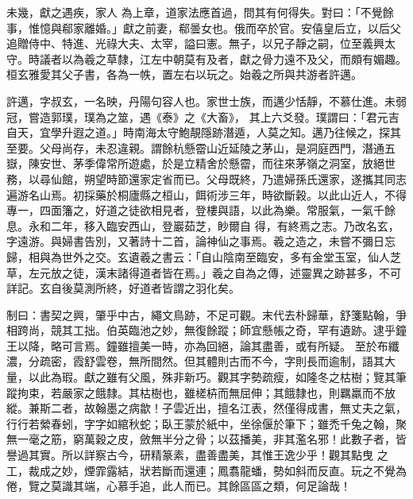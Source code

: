 \begin{pinyinscope}
 未幾，獻之遇疾，家人
 為上章，道家法應首過，問其有何得失。對曰：「不覺餘事，惟憶與郗家離婚。」獻之前妻，郗曇女也。俄而卒於官。安僖皇后立，以后父追贈侍中、特進、光祿大夫、太宰，謚曰憲。無子，以兄子靜之嗣，位至義興太守。時議者以為羲之草隸，江左中朝莫有及者，獻之骨力遠不及父，而頗有媚趣。桓玄雅愛其父子書，各為一帙，置左右以玩之。始羲之所與共游者許邁。



 許邁，字叔玄，一名映，丹陽句容人也。家世士族，而邁少恬靜，不慕仕進。未弱冠，嘗造郭璞，璞為之筮，遇《泰》之《大畜》，
 其上六爻發。璞謂曰：「君元吉自天，宜學升遐之道。」時南海太守鮑靚隱跡潛遁，人莫之知。邁乃往候之，探其至要。父母尚存，未忍違親。謂餘杭懸霤山近延陵之茅山，是洞庭西門，潛通五嶽，陳安世、茅季偉常所遊處，於是立精舍於懸霤，而往來茅嶺之洞室，放絕世務，以尋仙館，朔望時節還家定省而已。父母既終，乃遣婦孫氏還家，遂攜其同志遍游名山焉。初採藥於桐廬縣之桓山，餌術涉三年，時欲斷穀。以此山近人，不得專一，四面籓之，好道之徒欲相見者，登樓與語，以此為樂。常服氣，一氣千餘息。永和二年，移入臨安西山，登巖茹芝，眇爾自
 得，有終焉之志。乃改名玄，字遠游。與婦書告別，又著詩十二首，論神仙之事焉。羲之造之，未嘗不彌日忘歸，相與為世外之交。玄遺羲之書云：「自山陰南至臨安，多有金堂玉室，仙人芝草，左元放之徒，漢末諸得道者皆在焉。」羲之自為之傳，述靈異之跡甚多，不可詳記。玄自後莫測所終，好道者皆謂之羽化矣。



 制曰：書契之興，肇乎中古，繩文鳥跡，不足可觀。末代去朴歸華，舒箋點翰，爭相跨尚，競其工拙。伯英臨池之妙，無復餘蹤；師宜懸帳之奇，罕有遺跡。逮乎鐘王以降，略可言焉。鐘雖擅美一時，亦為回絕，論其盡善，或有所疑。
 至於布纖濃，分疏密，霞舒雲卷，無所間然。但其體則古而不今，字則長而逾制，語其大量，以此為瑕。獻之雖有父風，殊非新巧。觀其字勢疏瘦，如隆冬之枯樹；覽其筆蹤拘束，若嚴家之餓隸。其枯樹也，雖槎枿而無屈伸；其餓隸也，則羈羸而不放縱。兼斯二者，故翰墨之病歙！子雲近出，擅名江表，然僅得成書，無丈夫之氣，行行若縈春蚓，字字如綰秋蛇；臥王蒙於紙中，坐徐偃於筆下；雖禿千兔之翰，聚無一毫之筋，窮萬穀之皮，斂無半分之骨；以茲播美，非其濫名邪！此數子者，皆譽過其實。所以詳察古今，研精篆素，盡善盡美，其惟王逸少乎！觀其點曳
 之工，裁成之妙，煙霏露結，狀若斷而還連；鳳翥龍蟠，勢如斜而反直。玩之不覺為倦，覽之莫識其端，心慕手追，此人而已。其餘區區之類，何足論哉！



\end{pinyinscope}